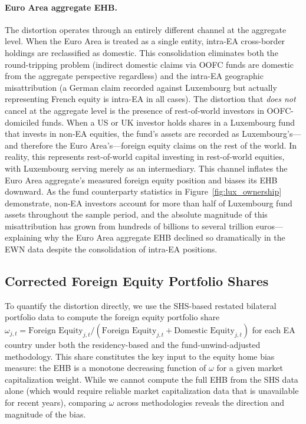 \documentclass{article}
\begin{document}
\paragraph{Euro Area aggregate EHB.} The distortion operates through an 
entirely different channel at the aggregate level. When the Euro Area is 
treated as a single entity, intra-EA cross-border holdings are 
reclassified as domestic. This consolidation eliminates both the 
round-tripping problem (indirect domestic claims via OOFC funds are 
domestic from the aggregate perspective regardless) and the intra-EA 
geographic misattribution (a German claim recorded against Luxembourg 
but actually representing French equity is intra-EA in all cases). 
The distortion that \textit{does not} cancel at the aggregate level is 
the presence of rest-of-world investors in OOFC-domiciled funds. When a 
US or UK investor holds shares in a Luxembourg fund that invests in 
non-EA equities, the fund's assets are recorded as Luxembourg's---and 
therefore the Euro Area's---foreign equity claims on the rest of the 
world. In reality, this represents rest-of-world capital investing in 
rest-of-world equities, with Luxembourg serving merely as an 
intermediary. This channel inflates the Euro Area aggregate's measured 
foreign equity position and biases its EHB downward. As the fund 
counterparty statistics in Figure~\ref{fig:lux_ownership} demonstrate, 
non-EA investors account for more than half of Luxembourg fund assets 
throughout the sample period, and the absolute magnitude of this 
misattribution has grown from hundreds of billions to several trillion 
euros---explaining why the Euro Area aggregate EHB declined so 
dramatically in the EWN data despite the consolidation of intra-EA 
positions.

\subsection{Corrected Foreign Equity Portfolio Shares}

To quantify the distortion directly, we use the SHS-based restated 
bilateral portfolio data to compute the foreign equity portfolio share 
$\omega_{j,t} = \text{Foreign Equity}_{j,t} / (\text{Foreign Equity}_{j,t} 
+ \text{Domestic Equity}_{j,t})$ for each EA country under both the 
residency-based and the fund-unwind-adjusted methodology. This share 
constitutes the key input to the equity home bias measure: the EHB is a 
monotone decreasing function of $\omega$ for a given market capitalization 
weight. While we cannot compute the full EHB from the SHS data alone 
(which would require reliable market capitalization data that is 
unavailable for recent years), comparing $\omega$ across methodologies 
reveals the direction and magnitude of the bias.
\end{document}
